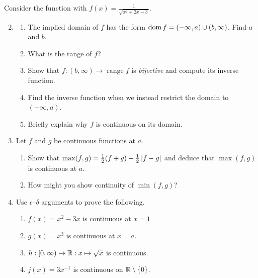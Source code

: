 \begin{exercisessec}{}{}
	\exstart Consider the function with $f(x)=\frac 1{\sqrt{x^2+2x-3}}$.\vspace{-2pt}
	\begin{enumerate}\setcounter{enumi}{1}
	  \item[]\begin{enumerate}
	    \item The implied domain of $f$ has the form $\operatorname{dom} f=(-\infty,a)\cup (b,\infty)$. Find $a$ and $b$.
	    \item What is the range of $f$?
	    \item Show that $f:(b,\infty)\to\operatorname{range}f$ is \emph{bijective} and compute its inverse function.
	    \item Find the inverse function when we instead restrict the domain to $(-\infty,a)$.
	    \item Briefly explain why $f$ is continuous on its domain.
	  \end{enumerate}
	  
  \item %
  \label{exs:maxcont}
  Let $f$ and $g$ be continuous functions at $a$.
  \begin{enumerate}
    \item Show that $\max(f,g)=\frac 12(f+g)+\frac 12\left| f-g\right|$ and deduce that $\max(f,g)$ is continuous at $a$. 
  	\item How might you show continuity of $\min(f,g)$?
  \end{enumerate}
  

  

  
  \item Use $\epsilon$--$\delta$ arguments to prove the following.
  \begin{enumerate}
  	\item $f(x)=x^2-3x$ is continuous at $x=1$
  	\item $g(x)=x^3$ is continuous at $x=a$.
  	\item $h:[0,\infty)\to\mathbb{R}:x\mapsto\sqrt x$ is continuous.
  	\item $j(x)=3x^{-1}$ is continuous on $\mathbb{R}\setminus\{0\}$.
  \end{enumerate}
  

\end{enumerate}
\end{exercisessec}
